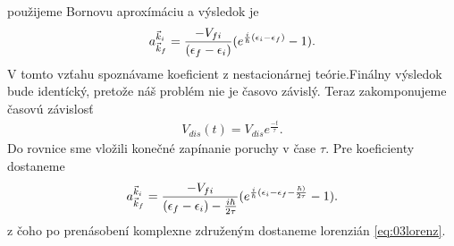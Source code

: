 použijeme Bornovu aproxímáciu a výsledok je
\begin{align}
\label{eq:03coef_nonstac}
a^{\vec{k}_i}_{\vec{k}_f}=\frac{-V_{fi}}{(\epsilon_f-\epsilon_i)}(e^{\frac{i}{\hbar}(\epsilon_i-\epsilon_f)}-1)\text{.}
\end{align}
V tomto vzťahu spoznávame koeficient z nestacionárnej teórie.Finálny výsledok bude identícký, pretože náš problém nie je časovo závislý. Teraz zakomponujeme časovú  závislosť
\begin{align}
V_{dis}(t)=V_{dis}e^{\frac{-t}{\tau}} \text{.}
\end{align}
Do rovnice sme vložili konečné zapínanie poruchy v čase $\tau$. Pre koeficienty dostaneme
\begin{align}
\label{eq:03coef_nonstac2}
a^{\vec{k}_i}_{\vec{k}_f}=\frac{-V_{fi}}{(\epsilon_f-\epsilon_i)-\frac{i\hbar}{2\tau}}(e^{\frac{i}{\hbar}(\epsilon_i-\epsilon_f-\frac{\hbar)}{2\tau}}-1)\text{.}
\end{align}
z čoho po prenásobení komplexne združeným dostaneme lorenzián \eqref{eq:03lorenz}.
